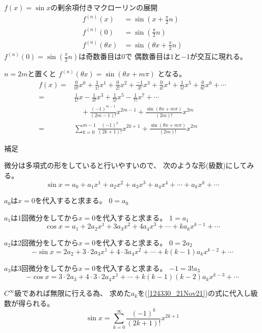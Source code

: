 \documentclass[12pt,b5paper]{ltjsarticle}
\begin{document}
$f(x)=\sin x$の剰余項付きマクローリンの展開
\begin{align}
 f^{(n)}(x)&=\sin(x+\frac{\pi}{2}n)\\
 f^{(n)}(0)&=\sin(\frac{\pi}{2}n)\\
 f^{(n)}(\theta x)&=\sin(\theta x+\frac{\pi}{2}n)
\end{align}
$f^{(n)}(0)=\sin(\frac{\pi}{2}n)$は奇数番目は$0$で
偶数番目は$1$と$-1$が交互に現れる。

$n=2m$と置くと
$f^{(n)}(\theta x)=\sin(\theta x+m\pi)$
となる。
\begin{align}
 f(x) =& \frac{0}{0!}x^0 + \frac{1}{1!}x^1 + \frac{0}{2!}x^2
         + \frac{-1}{3!}x^3 + \frac{0}{4!}x^4 + \frac{1}{5!}x^5 + \frac{0}{6!}x^6 + \cdots \\
 =& \frac{1}{1!}x - \frac{1}{3!}x^3 + \frac{1}{5!}x^5 - \frac{1}{7!}x^7 + \cdots \nonumber\\
   & \quad + \frac{(-1)^{m-1}}{(2m-1)!}x^{2m-1} + \frac{\sin(\theta x+m\pi)}{(2m)!}x^{2m}\\
 =& \sum_{k=0}^{m-1}\frac{(-1)^k}{(2k+1)!}x^{2k+1} + \frac{\sin(\theta x+m\pi)}{(2m)!}x^{2m}
\end{align}

\hrulefill


補足

微分は多項式の形をしていると行いやすいので、
次のような形(級数)にしてみる。
\begin{equation}
 \sin x = a_0 + a_1x^1 + a_2x^2 + a_3x^3 + a_4x^4 + \cdots + a_kx^k + \cdots\label{124330_21Nov21}
\end{equation}

$a_0$は$x=0$を代入すると求まる。
$0=a_0$

$a_1$は1回微分をしてから$x=0$を代入すると求まる。
$1 = a_1$
\begin{equation}
 \cos x = a_1 + 2a_2x^1 + 3a_3x^2 + 4a_4x^3 + \cdots + ka_kx^{k-1} + \cdots
\end{equation}

$a_2$は2回微分をしてから$x=0$を代入すると求まる。
$0 = 2a_2$
\begin{equation}
 -\sin x = 2a_2 + 3\cdot 2a_3x^1 + 4\cdot 3a_4x^2 + \cdots + k(k-1)a_kx^{k-2} + \cdots
\end{equation}


$a_3$は3回微分をしてから$x=0$を代入すると求まる。
$-1 = 3!a_3$
\begin{equation}
 -\cos x = 3\cdot 2a_3 + 4\cdot 3\cdot 2a_4x^1 + \cdots + k(k-1)(k-2)a_kx^{k-3} + \cdots
\end{equation}

$C^{\infty}$級であれば無限に行える為、
求めた$a_k$を(\ref{124330_21Nov21})の式に代入し級数が得られる。
\begin{equation}
 \sin x = \sum_{k=0}^{\infty}\frac{(-1)^k}{(2k+1)!}x^{2k+1}
\end{equation}
\end{document}
